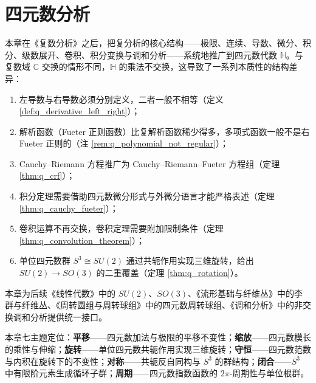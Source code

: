 \chapter{四元数分析}
\label{chap:quaternion_analysis}

\begin{remark}[本章定位]\label{rem:q_chapter_positioning}
本章在《复数分析》之后，把复分析的核心结构——极限、连续、导数、微分、积分、级数展开、卷积、积分变换与调和分析——系统地推广到四元数代数 $\mathbb{H}$。与复数域 $\mathbb{C}$ 交换的情形不同，$\mathbb{H}$ 的乘法不交换，这导致了一系列本质性的结构差异：
\begin{enumerate}[label=(\roman*)]
    \item 左导数与右导数必须分别定义，二者一般不相等（定义 \ref{def:q_derivative_left_right}）；
    \item 解析函数（Fueter 正则函数）比复解析函数稀少得多，多项式函数一般不是右 Fueter 正则的（注 \ref{rem:q_polynomial_not_regular}）；
    \item Cauchy--Riemann 方程推广为 Cauchy--Riemann--Fueter 方程组（定理 \ref{thm:q_crf}）；
    \item 积分定理需要借助四元数微分形式与外微分语言才能严格表述（定理 \ref{thm:q_cauchy_fueter}）；
    \item 卷积运算不再交换，卷积定理需要附加限制条件（定理 \ref{thm:q_convolution_theorem}）；
    \item 单位四元数群 $S^3\cong SU(2)$ 通过共轭作用实现三维旋转，给出 $SU(2)\to SO(3)$ 的二重覆盖（定理 \ref{thm:q_rotation}）。
\end{enumerate}
本章为后续《线性代数》中的 $SU(2)$、$SO(3)$、《流形基础与纤维丛》中的李群与纤维丛、《周转圆组与周转球组》中的四元数周转球组、《调和分析》中的非交换调和分析提供统一接口。

本章七主题定位：\textbf{平移}——四元数加法与极限的平移不变性；\textbf{缩放}——四元数模长的乘性与伸缩；\textbf{旋转}——单位四元数共轭作用实现三维旋转；\textbf{守恒}——四元数范数与内积在旋转下的不变性；\textbf{对称}——共轭反自同构与 $S^3$ 的群结构；\textbf{闭合}——$S^3$ 中有限阶元素生成循环子群；\textbf{周期}——四元数指数函数的 $2\pi$-周期性与单位根群。
\end{remark}

